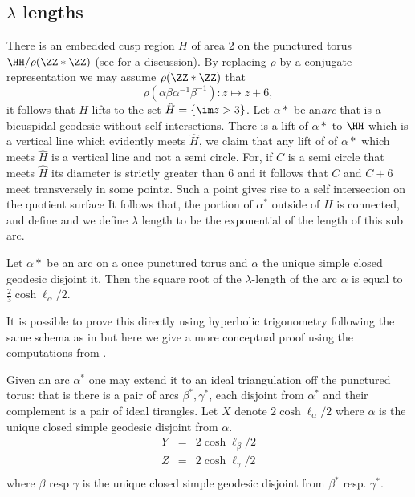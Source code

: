 \subsection{$\lambda$ lengths}

There is an embedded cusp region $H$ of area $2$ 
on the punctured torus $\HH/\rho(\ZZ*\ZZ)$
(see \cite{thesis} for a discussion).
By replacing $\rho$ by a conjugate representation
we may assume $\rho(\ZZ*\ZZ)$  that 
$$\rho(\alpha\beta\alpha^{-1}\beta^{-1}): z \mapsto z + 6,$$
it follows that $H$ lifts to the set $\hat{H} = \{ \im z > 3 \}$.
Let $\alpha*$ be an\textit{arc} that is a bicuspidal geodesic
without self intersetions.
There is a lift of $\alpha*$ to $\HH$ which is a vertical line
which evidently meets $\hat{H}$,
we claim that any lift of of $\alpha*$ 
which meets $\hat{H}$ is a vertical line and not a semi circle.
For, if $C$ is a semi circle that meets $\hat{H}$ 
its diameter is strictly greater than $6$ 
and it follows that $C$ and $C + 6$ meet transversely in some point$x$.
Such a point gives rise to a self intersection on the quotient surface
It follows that, the portion of $\alpha^*$ outside of $H$ is connected,
and define and we define  $\lambda$ length 
to be the exponential of the length of this sub arc.

\begin{lem}\label{lambda length}
Let $\alpha*$ be an arc on a once punctured torus 
and $\alpha$ the unique 
simple closed geodesic disjoint it.
Then the square root of the $\lambda$-length  of the arc $\alpha$
is equal to $\frac{2}{3}\cosh \ell_\alpha / 2$.
\end{lem}

It is possible to prove this directly using hyperbolic trigonometry 
following the same schema as in \cite{thesis}
but here we give a more conceptual proof  using the computations from \cite{saw}.

Given an arc $\alpha^*$ one may extend it to an ideal triangulation off the punctured torus:
that is there is a pair of arcs $\beta^*,\gamma^*$, each disjoint from  $\alpha^*$ and their complement 
is a pair of ideal tirangles. 
Let $X$ denote $2 \cosh \ell_\alpha / 2$ where $\alpha$ is the unique closed simple 
geodesic disjoint from $\alpha$.
\begin{eqnarray*}
Y &=& 2 \cosh \ell_\beta / 2 \\
Z  &=& 2 \cosh \ell_\gamma / 2 \\
\end{eqnarray*}
where $\beta$ resp $\gamma$ is the unique closed simple  geodesic disjoint from
$\beta^*$ resp. $\gamma^*$.

